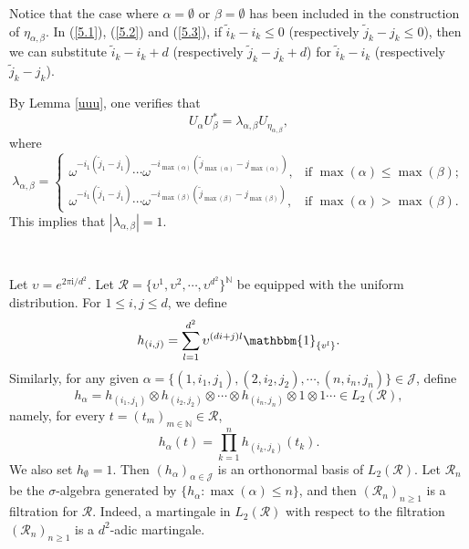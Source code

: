 \documentclass[oneside,english,a4wide]{amsart}
\numberwithin{equation}{section}
\numberwithin{figure}{section}
\theoremstyle{plain}
\theoremstyle{plain}
\theoremstyle{definition}
\theoremstyle{plain}
\theoremstyle{remark}
\theoremstyle{definition}
\theoremstyle{remark}
\theoremstyle{definition}
\newcommand{\8}{\infty}
\begin{document}
Notice that the case where $\alpha=\emptyset$ or $\beta=\emptyset$ has been included in the construction of $\eta_{\alpha,\beta}$. In (\ref{5.1}), (\ref{5.2}) and (\ref{5.3}), if $\tilde{i}_k-i_k\leq 0$ (respectively $\tilde{j}_k-j_k\leq 0$), then we can substitute $\tilde{i}_k-i_k+d$ (respectively $\tilde{j}_k-j_k+d$) for $\tilde{i}_k-i_k$ (respectively $\tilde{j}_k-j_k$).


By Lemma \ref{uuu}, one verifies that 
\begin{equation}\label{ual}
	U_\alpha U_\beta^*=\lambda_{\alpha,\beta}U_{\eta_{\alpha,\beta}},
\end{equation}
where
\begin{equation*}
	\lambda_{\alpha,\beta}=
	\begin{cases}
		\omega^{-i_{1}(\tilde{j}_{1}-j_{1})}\cdots \omega^{-i_{\max(\alpha)}(\tilde{j}_{\max(\alpha)}-j_{\max(\alpha)})},& \text{if $\max(\alpha)\le \max(\beta)$};\\
		\omega^{-i_{1}(\tilde{j}_{1}-j_{1})}\cdots \omega^{-i_{\max(\beta)}(\tilde{j}_{\max(\beta)}-j_{\max(\beta)})},& \text{if $\max(\alpha)> \max(\beta)$}.
	\end{cases}
\end{equation*}
This implies that $|\lambda_{\alpha,\beta}|=1$.

\

Let $\upsilon=e^{2\pi \mathrm{i}/d^2}$. Let $\mathcal{R}=\{\upsilon^1,\upsilon^2,\cdots,\upsilon^{d^2}\}^{\mathbb{N}}$ be equipped with the uniform distribution. For $1\le i, j\le d$, we define
\[h_{(i, j)}=\sum_{l=1}^{d^2}\upsilon^{(di+j)l}\mathbbm{1}_{{\{v^l\}}}.\]
Similarly, for any given $\alpha=\{(1,i_{1},j_{1}),(2,i_{2},j_{2}),\cdots,(n,i_{n},j_{n})\}\in\mathcal{J}$, define
\[h_\alpha=h_{(i_1,j_1)}\otimes h_{(i_2,j_2)}\otimes\cdots\otimes h_{(i_n,j_n)}\otimes 1\otimes 1\cdots\in L_2(\mathcal{R}),\]
namely, for every $t=(t_m)_{m\in\mathbb{N}}\in\mathcal{R}$,
$$ h_\alpha(t)=\prod_{k=1}^nh_{(i_k,j_k)}(t_k). $$
We also set $h_\emptyset=1$. Then $(h_\alpha)_{\alpha\in\mathcal{J}}$ is an orthonormal basis of $L_2(\mathcal{R})$. Let $\mathscr{R}_n$ be the $\sigma$-algebra generated by $\{h_\alpha: \max(\alpha)\leq n\}$, and then $(\mathscr{R}_n)_{n\geq 1}$ is a filtration for $\mathcal{R}$. Indeed, a martingale in $L_2(\mathcal{R})$ with respect to the filtration $(\mathscr{R}_n)_{n\geq 1}$ is a $d^2$-adic martingale.
\end{document}
